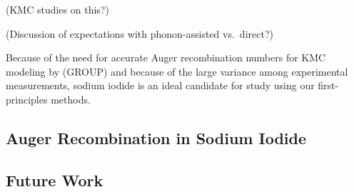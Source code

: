 (KMC studies on this?)

(Discussion of expectations with phonon-assisted vs.~direct?)

Because of the need for accurate Auger recombination numbers for KMC
modeling by (GROUP) and because of the large variance among experimental
measurements, sodium iodide is an ideal candidate for study using our
first-principles methods.

\subsection{Auger Recombination in Sodium
Iodide}\label{auger-recombination-in-sodium-iodide}

\subsection{Future Work}\label{future-work}
